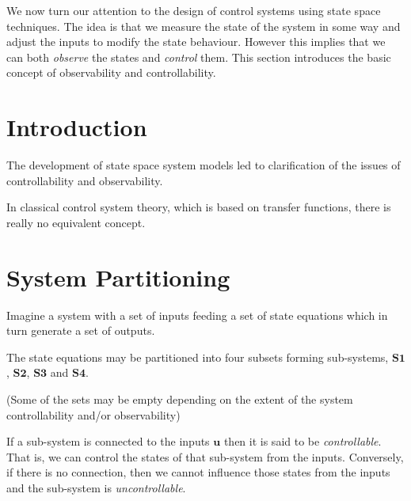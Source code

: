 \def\FileDate{10/02/01}
\def\FileVersion{1.0}

We now turn our attention to the design of control systems using state space techniques. The idea is that we measure the state of the system in some way and adjust the inputs to modify the state behaviour. However this implies that we can both \emph{observe} the states and \emph{control} them. This section introduces the basic concept of observability and controllability.

\section*{Introduction}

The development of state space system models led to clarification of the issues of controllability and observability.

In classical control system theory, which is based on transfer functions, there is really no equivalent concept.

\section*{System Partitioning} %
\label{sec:system_partitioning}

Imagine a system with a set of inputs feeding a set of state equations which in turn generate a set of outputs.

The state equations may be partitioned into four subsets forming sub-systems, $\mathbf{S1}$, $\mathbf{S2}$, $\mathbf{S3}$ and $\mathbf{S4}$. 

(Some of the sets may be empty depending on the extent of the system controllability and/or observability)


\ifslidesonly
\begin{slide}
   
\end{slide}
\fi

If a sub-system is connected to the inputs $\mathbf{u}$ then it is said to be \emph{controllable}. That is, we can control the states of that sub-system from the inputs. Conversely, if there is no connection, then we cannot influence those states from the inputs and the sub-system is \emph{uncontrollable}.

